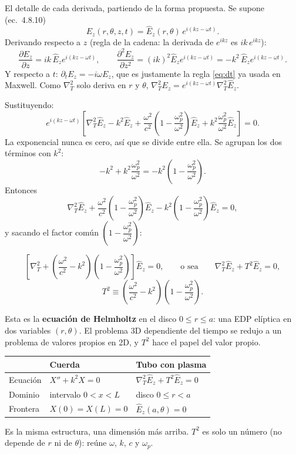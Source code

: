 \documentclass[11pt,a4paper]{article}
\renewcommand{\wp}{\omega_p}
\newcommand{\Kp}{\left(1-\dfrac{\wp^2}{\omega^2}\right)}
\begin{document}
\noindent El detalle de cada derivada, partiendo de la forma propuesta.
Se supone (ec.\ 4.8.10)
\[
E_z(r,\theta,z,t)=\hat E_z(r,\theta)\,e^{i(kz-\omega t)} .
\]
Derivando respecto a $z$ (regla de la cadena: la derivada de $e^{ikz}$ es $ik\,e^{ikz}$):
\[
\frac{\partial E_z}{\partial z}=ik\,\hat E_z e^{i(kz-\omega t)},\qquad
\frac{\partial^2E_z}{\partial z^2}=(ik)^2\hat E_z e^{i(kz-\omega t)}=-k^2\,\hat E_z e^{i(kz-\omega t)} .
\]
Y respecto a $t$: $\partial_tE_z=-i\omega E_z$, que es justamente la regla \eqref{eq:dt} ya usada en Maxwell. Como $\nabla_T^2$ solo deriva en $r$ y $\theta$, $\nabla_T^2E_z=e^{i(kz-\omega t)}\nabla_T^2\hat E_z$.

Sustituyendo:
\[
e^{i(kz-\omega t)}\left[\nabla_T^2\hat E_z-k^2\hat E_z+\frac{\omega^2}{c^2}\Kp\hat E_z+k^2\frac{\wp^2}{\omega^2}\hat E_z\right]=0 .
\]
La exponencial nunca es cero, así que se divide entre ella. Se agrupan los dos términos con $k^2$:
\[
-k^2+k^2\frac{\wp^2}{\omega^2}=-k^2\Kp .
\]
Entonces
\[
\nabla_T^2\hat E_z+\frac{\omega^2}{c^2}\Kp\hat E_z-k^2\Kp\hat E_z=0,
\]
y sacando el factor común $\Kp$:
\begin{resultado}[Ecuación 4.8.11]
\[
\left[\nabla_T^2+\left(\frac{\omega^2}{c^2}-k^2\right)\Kp\right]\hat E_z=0,
\qquad\text{o sea}\qquad
\nabla_T^2\hat E_z+T^2\hat E_z=0,
\]
\[
T^2\equiv\left(\frac{\omega^2}{c^2}-k^2\right)\Kp. \tag{4.8.13}
\]
\end{resultado}
Esta es la \textbf{ecuación de Helmholtz} en el disco $0\le r\le a$: una EDP elíptica en dos variables $(r,\theta)$. El problema 3D dependiente del tiempo se redujo a un problema de valores propios en 2D, y $T^2$ hace el papel del valor propio.

\begin{ojo}
\begin{center}
\renewcommand{\arraystretch}{1.4}
\begin{tabular}{@{}lll@{}}
\toprule
 & Cuerda & Tubo con plasma \\
\midrule
Ecuación & $X''+k^2X=0$ & $\nabla_T^2\hat E_z+T^2\hat E_z=0$ \\
Dominio & intervalo $0<x<L$ & disco $0\le r<a$ \\
Frontera & $X(0)=X(L)=0$ & $\hat E_z(a,\theta)=0$ \\
\bottomrule
\end{tabular}
\end{center}
Es la misma estructura, una dimensión más arriba. $T^2$ es solo un número (no depende de $r$ ni de $\theta$): reúne $\omega$, $k$, $c$ y $\wp$.
\end{ojo}
\end{document}
